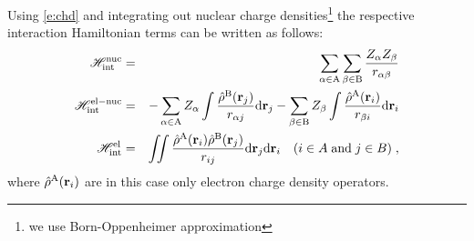 \documentclass[a4paper,titlepage,twoside,fleqn]{article}
\newcommand{\VEC}[1]{\ensuremath{\mathrm{\mathbf{#1}}}}
\begin{document}
Using \ref{e:chd} and integrating out nuclear charge densities\footnote{we use Born-Oppenheimer approximation} 
the respective interaction Hamiltonian terms can be written 
as follows:
\begin{eqnarray}\label{e:rho}
\mathscr{H}_{\rm int}^{\rm nuc}    &=&   \sum_{\alpha \in {\rm A}} \sum_{\beta \in {\rm B}} \frac{Z_{\alpha}Z_{\beta}}{r_{\alpha\beta}} \\
\mathscr{H}_{\rm int}^{\rm el-nuc} &=& - \sum_{\alpha \in {\rm A}} Z_{\alpha} \int \frac{\hat{\rho}^{\rm B}(\VEC{r}_j)}{r_{\alpha j}} {\rm d}\VEC{r}_j
                                       - \sum_{\beta  \in {\rm B}} Z_{\beta}  \int \frac{\hat{\rho}^{\rm A}(\VEC{r}_i)}{r_{\beta  i}} {\rm d}\VEC{r}_i \\
\mathscr{H}_{\rm int}^{\rm el}     &=& \iint \frac{\hat{\rho}^{\rm A}(\VEC{r}_i)\hat{\rho}^{\rm B}(\VEC{r}_j)}{r_{ij}} 
                                       {\rm d}\VEC{r}_j {\rm d}\VEC{r}_i \quad (i\in A \;{\rm and}\;  j\in B)\; ,
\end{eqnarray} 
where $\hat{\rho}^{\rm A}(\VEC{r}_i)$ are in this case only electron 
charge density operators.
\end{document}
